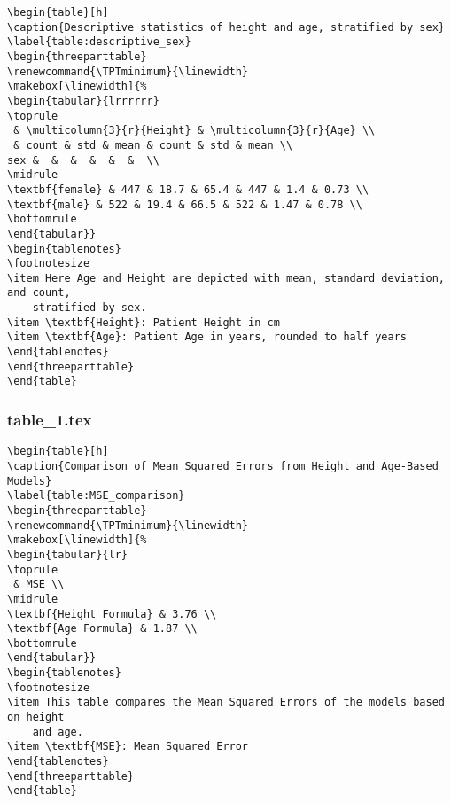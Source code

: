\documentclass[11pt]{article}
\begin{document}
\begin{Verbatim}[tabsize=4]
\begin{table}[h]
\caption{Descriptive statistics of height and age, stratified by sex}
\label{table:descriptive_sex}
\begin{threeparttable}
\renewcommand{\TPTminimum}{\linewidth}
\makebox[\linewidth]{%
\begin{tabular}{lrrrrrr}
\toprule
 & \multicolumn{3}{r}{Height} & \multicolumn{3}{r}{Age} \\
 & count & std & mean & count & std & mean \\
sex &  &  &  &  &  &  \\
\midrule
\textbf{female} & 447 & 18.7 & 65.4 & 447 & 1.4 & 0.73 \\
\textbf{male} & 522 & 19.4 & 66.5 & 522 & 1.47 & 0.78 \\
\bottomrule
\end{tabular}}
\begin{tablenotes}
\footnotesize
\item Here Age and Height are depicted with mean, standard deviation, and count,
	stratified by sex.
\item \textbf{Height}: Patient Height in cm
\item \textbf{Age}: Patient Age in years, rounded to half years
\end{tablenotes}
\end{threeparttable}
\end{table}

\end{Verbatim}

\subsubsection*{table\_1.tex}

\begin{Verbatim}[tabsize=4]
\begin{table}[h]
\caption{Comparison of Mean Squared Errors from Height and Age-Based Models}
\label{table:MSE_comparison}
\begin{threeparttable}
\renewcommand{\TPTminimum}{\linewidth}
\makebox[\linewidth]{%
\begin{tabular}{lr}
\toprule
 & MSE \\
\midrule
\textbf{Height Formula} & 3.76 \\
\textbf{Age Formula} & 1.87 \\
\bottomrule
\end{tabular}}
\begin{tablenotes}
\footnotesize
\item This table compares the Mean Squared Errors of the models based on height
	and age.
\item \textbf{MSE}: Mean Squared Error
\end{tablenotes}
\end{threeparttable}
\end{table}

\end{Verbatim}
\end{document}
